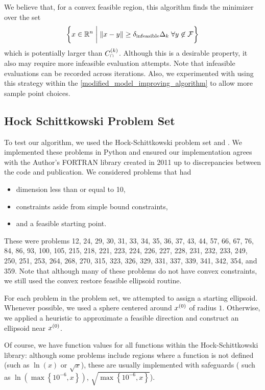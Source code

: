 {We believe that, for a convex feasible region, this algorithm finds the minimizer over the set 
\begin{align*}
\left\{x \in \mathbb R^n \; \bigg | \; \|x - y \| \ge {\delta_\textrm{infeasible}} \Delta_k \; \forall y \not \in {\mathcal F} \right\}
\end{align*}
which is potentially larger than ${C^{(k)}_{\cap}}$.
Although this is a desirable property, it also may require more infeasible evaluation attempts.
Note that infeasible evaluations can be recorded across iterations.
Also, we experimented with using this strategy within the \cref{modified_model_improving_algorithm} to allow more sample point choices.

}{}

\subsection{Hock Schittkowski Problem Set}

To test our algorithm, we used the Hock-Schittkowski problem set \cite{Hock1980} and \cite{Schittkowski:1987:MTE:27135}.
We implemented these problems in Python and ensured our implementation agrees with the Author's FORTRAN library created in 2011 
up to discrepancies between the code and publication.
We considered problems that had
\begin{itemize}
\item dimension less than or equal to 10,
\item constraints aside from simple bound constraints,
\item and a feasible starting point.
\end{itemize}

These were problems
12,
24,
29,
30,
31,
33,
34,
35,
36,
37,
43,
44,
57,
66,
67,
76,
84,
86,
93,
100,
105,
215,
218,
221,
223,
224,
226,
227,
228,
231,
232,
233,
249,
250,
251,
253,
264,
268,
270,
315,
323,
326,
329,
331,
337,
339,
341,
342,
354,
and 359.
Note that although many of these problems do not have convex constraints, we still used the convex restore feasible ellipsoid routine.

For each problem in the problem set, we attempted to assign a starting ellipsoid.
Whenever possible, we used a sphere centered around ${x^{(0)}}$ of radius $1$.
Otherwise, we applied a heuristic to approximate a feasible direction and construct an ellipsoid near ${x^{(0)}}$.

Of course, we have function values for all functions within the Hock-Schittkowski library:
although some problems include regions where a function is not defined (such as $\ln(x)$ or $\sqrt{x}$), 
these are usually implemented with safeguards (
such as $\ln\left(\max\left\{10^{-6}, x\right\}\right)$, $\sqrt{\max\left\{10^{-6}, x\right\}}$).

